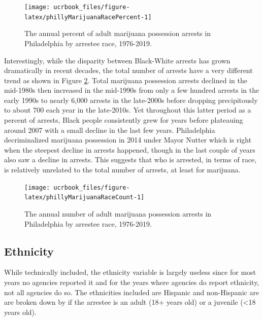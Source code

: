 \documentclass[
  12pt,
  openany]{book}
\begin{document}
\begin{figure}

{\centering \texttt{[image: ucrbook\_files/figure-latex/phillyMarijuanaRacePercent-1]} 

}

\caption{The annual percent of adult marijuana possession arrests in Philadelphia by arrestee race, 1976-2019.}\label{fig:phillyMarijuanaRacePercent}
\end{figure}

Interestingly, while the disparity between Black-White arrests has grown dramatically in recent decades, the total number of arrests have a very different trend as shown in Figure \ref{fig:phillyMarijuanaRaceCount}. Total marijuana possession arrests declined in the mid-1980s then increased in the mid-1990s from only a few hundred arrests in the early 1990s to nearly 6,000 arrests in the late-2000s before dropping precipitously to about 700 each year in the late-2010s. Yet throughout this latter period as a percent of arrests, Black people consistently grew for years before plateauing around 2007 with a small decline in the last few years. Philadelphia decriminalized marijuana possession in 2014 under Mayor Nutter which is right when the steepest decline in arrests happened, though in the last couple of years also saw a decline in arrests. This suggests that who is arrested, in terms of race, is relatively unrelated to the total number of arrests, at least for marijuana.

\begin{figure}

{\centering \texttt{[image: ucrbook\_files/figure-latex/phillyMarijuanaRaceCount-1]} 

}

\caption{The annual number of adult marijuana possession arrests in Philadelphia by arrestee race, 1976-2019.}\label{fig:phillyMarijuanaRaceCount}
\end{figure}

\hypertarget{ethnicity}{%
\subsection{Ethnicity}\label{ethnicity}}

While technically included, the ethnicity variable is largely useless since for most years no agencies reported it and for the years where agencies do report ethnicity, not all agencies do so. The ethnicities included are Hispanic and non-Hispanic are are broken down by if the arrestee is an adult (18+ years old) or a juvenile (\textless18 years old).
\end{document}
